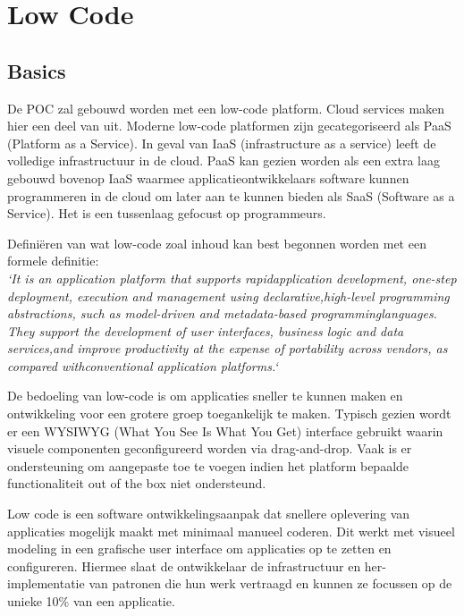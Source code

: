 
\section{Low Code}

\subsection{Basics}

De POC zal gebouwd worden met een low-code platform. Cloud services maken hier een deel van uit. Moderne low-code platformen zijn gecategoriseerd als PaaS (Platform as a Service). In geval van IaaS (infrastructure as a service) leeft de volledige infrastructuur in de cloud. PaaS kan gezien worden als een extra laag gebouwd bovenop IaaS waarmee applicatieontwikkelaars software kunnen programmeren in de cloud om later aan te kunnen bieden als SaaS (Software as a Service). Het is een tussenlaag gefocust op programmeurs. \autocite{Nucleus2017}

Definiëren van wat low-code zoal inhoud kan best begonnen worden met een formele definitie:\\
\textit{`It is an application platform that supports rapidapplication development, one-step deployment, execution and management using declarative,high-level programming abstractions, such as model-driven and metadata-based programminglanguages. They support the development of user interfaces, business logic and data services,and improve productivity at the expense of portability across vendors, as compared withconventional application platforms.`} \autocite{Vincent2019}

De bedoeling van low-code is om applicaties sneller te kunnen maken en ontwikkeling voor een grotere groep toegankelijk te maken. Typisch gezien wordt er een WYSIWYG (What You See Is What You Get) interface gebruikt waarin visuele componenten geconfigureerd worden via drag-and-drop. Vaak is er ondersteuning om aangepaste toe te voegen indien het platform bepaalde functionaliteit out of the box niet ondersteund. \autocite{Kissflow2018}

Low code is een software ontwikkelingsaanpak dat snellere oplevering van applicaties mogelijk maakt met minimaal manueel coderen. Dit werkt met visueel modeling in een grafische user interface om applicaties op te zetten en configureren. Hiermee slaat de ontwikkelaar de infrastructuur en her-implementatie van patronen die hun werk vertraagd en kunnen ze focussen op de unieke 10\% van een applicatie. \autocite{Revell2020}

